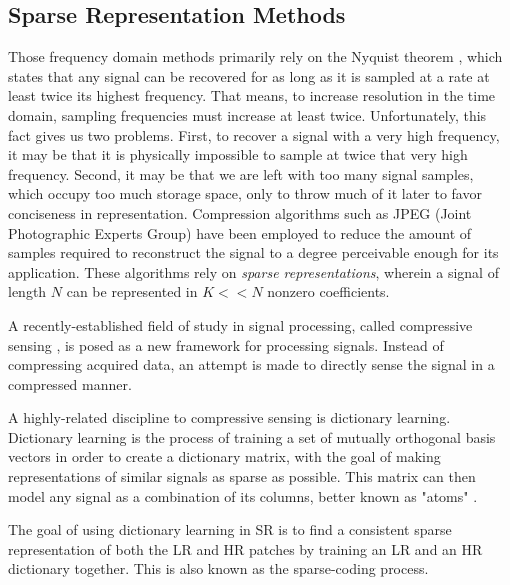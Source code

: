 \subsection{Sparse Representation Methods}
Those frequency domain methods primarily rely on the Nyquist theorem \citep{Nyquist1928}, which states that any signal can be recovered for as long as it is sampled at a rate at least twice its highest frequency.
That means, to increase resolution in the time domain, sampling frequencies must increase at least twice. 
Unfortunately, this fact gives us two problems. First, to recover a signal with a very high frequency, it may be that it is physically impossible to sample at twice that very high frequency. 
Second, it may be that we are left with too many signal samples, which occupy too much storage space, only to throw much of it later to favor conciseness in representation.
Compression algorithms such as JPEG (Joint Photographic Experts Group) have been employed to reduce the amount of samples required to reconstruct the signal to a degree perceivable enough for its application.
These algorithms rely on \textit{sparse representations}, wherein a signal of length $N$ can be represented in $K<<N$ nonzero coefficients.


A recently-established field of study in signal processing, called compressive sensing \cite{Baraniuk2011}, is posed as a new framework for processing signals.
Instead of compressing acquired data, an attempt is made to directly sense the signal in a compressed manner.
	
A highly-related discipline to compressive sensing is dictionary learning. Dictionary learning is the process of training a set of mutually orthogonal basis vectors in order to create a dictionary matrix, with the goal of making representations of similar signals as sparse as possible.  
This matrix can then model any signal as a combination of its columns, better known as "atoms" \citep{Kreutz-Delgado2003}. 

The goal of using dictionary learning in SR is to find a consistent sparse representation of both the LR and HR patches by training an LR and an HR dictionary together. 
This is also known as the sparse-coding process.

